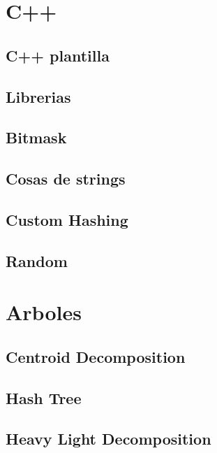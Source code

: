 \section{C++}
\subsection{C++ plantilla}
\raggedbottom
\hrulefill
\subsection{Librerias}
\raggedbottom
\hrulefill
\subsection{Bitmask}
\raggedbottom
\hrulefill
\subsection{Cosas de strings}
\raggedbottom
\hrulefill
\subsection{Custom Hashing}
\raggedbottom
\hrulefill
\subsection{Random}
\raggedbottom
\hrulefill

\section{Arboles}
\subsection{Centroid Decomposition}
\raggedbottom
\hrulefill
\subsection{Hash Tree}
\raggedbottom
\hrulefill
\subsection{Heavy Light Decomposition}
\raggedbottom
\hrulefill
